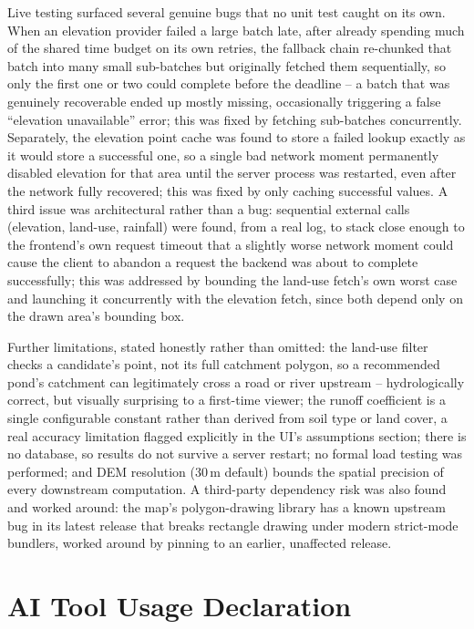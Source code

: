 \documentclass[manuscript,screen]{acmart}
\begin{document}
Live testing surfaced several genuine bugs that no unit test caught on
its own. When an elevation provider failed a large batch late, after
already spending much of the shared time budget on its own retries, the
fallback chain re-chunked that batch into many small sub-batches but
originally fetched them sequentially, so only the first one or two could
complete before the deadline -- a batch that was genuinely recoverable
ended up mostly missing, occasionally triggering a false
``elevation unavailable'' error; this was fixed by fetching sub-batches
concurrently. Separately, the elevation point cache was found to store a
failed lookup exactly as it would store a successful one, so a single bad
network moment permanently disabled elevation for that area until the
server process was restarted, even after the network fully recovered;
this was fixed by only caching successful values. A third issue was
architectural rather than a bug: sequential external calls (elevation,
land-use, rainfall) were found, from a real log, to stack close enough to
the frontend's own request timeout that a slightly worse network moment
could cause the client to abandon a request the backend was about to
complete successfully; this was addressed by bounding the land-use
fetch's own worst case and launching it concurrently with the elevation
fetch, since both depend only on the drawn area's bounding box.

Further limitations, stated honestly rather than omitted: the land-use
filter checks a candidate's point, not its full catchment polygon, so a
recommended pond's catchment can legitimately cross a road or river
upstream -- hydrologically correct, but visually surprising to a
first-time viewer; the runoff coefficient is a single configurable
constant rather than derived from soil type or land cover, a real
accuracy limitation flagged explicitly in the UI's assumptions section;
there is no database, so results do not survive a server restart; no
formal load testing was performed; and DEM resolution (30\,m default)
bounds the spatial precision of every downstream computation. A
third-party dependency risk was also found and worked around: the map's
polygon-drawing library has a known upstream bug in its latest release
that breaks rectangle drawing under modern strict-mode bundlers, worked
around by pinning to an earlier, unaffected release.

\section{AI Tool Usage Declaration}
\label{sec:ai-usage}
\end{document}
